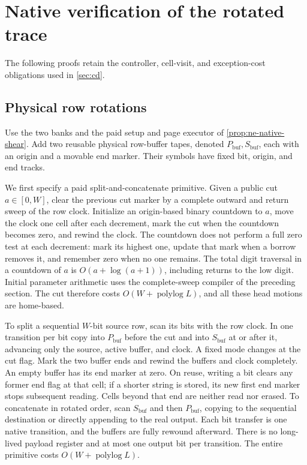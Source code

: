 \section{Native verification of the rotated trace}\label{sec:native-details}

The following proofs retain the controller, cell-visit, and exception-cost
obligations used in \cref{sec:cd}.

\subsection{Physical row rotations}\label{sec:details-cd-rotated-native}

\begin{informalproof}
Use the two banks and the paid setup and page executor of
\cref{prop:ne-native-shear}.  Add two reusable physical row-buffer
tapes, denoted $P_{\mathrm{buf}},S_{\mathrm{buf}}$, each with an origin and a movable
end marker.  Their symbols have fixed bit, origin, and end tracks.

We first specify a paid split-and-concatenate primitive.  Given a public
cut $a\in[0,W]$, clear the previous cut marker by a complete outward and
return sweep of the row clock.  Initialize an origin-based binary
countdown to $a$, move the clock one cell after each decrement, mark the
cut when the countdown becomes zero, and rewind the clock.  The countdown
does not perform a full zero test at each decrement: mark its highest
one, update that mark when a borrow removes it, and remember zero when
no one remains.  The total digit traversal in a countdown of $a$ is
$O(a+\log(a+1))$, including returns to the low digit.  Initial parameter
arithmetic uses the complete-sweep compiler of the preceding section.
The cut therefore costs $O(W+\operatorname{polylog}L)$, and all these
head motions are home-based.

To split a sequential $W$-bit source row, scan its bits with the row clock.
In one transition per bit copy into $P_{\mathrm{buf}}$ before the cut and into
$S_{\mathrm{buf}}$ at or after it, advancing only the source, active buffer,
and clock.  A fixed mode changes at the cut flag.  Mark the two buffer
ends and rewind the buffers and clock completely.  An empty buffer has
its end marker at zero.  On reuse, writing a bit clears any former end
flag at that cell; if a shorter string is stored, its new first end marker
stops subsequent reading.  Cells beyond that end are neither read nor
erased.  To concatenate in rotated order, scan $S_{\mathrm{buf}}$ and then
$P_{\mathrm{buf}}$, copying to the sequential destination or directly appending
to the real output.  Each bit transfer is one native transition, and the
buffers are fully rewound afterward.  There is no long-lived payload
register and at most one output bit per transition.  The entire primitive
costs $O(W+\operatorname{polylog}L)$.


\end{informalproof}
